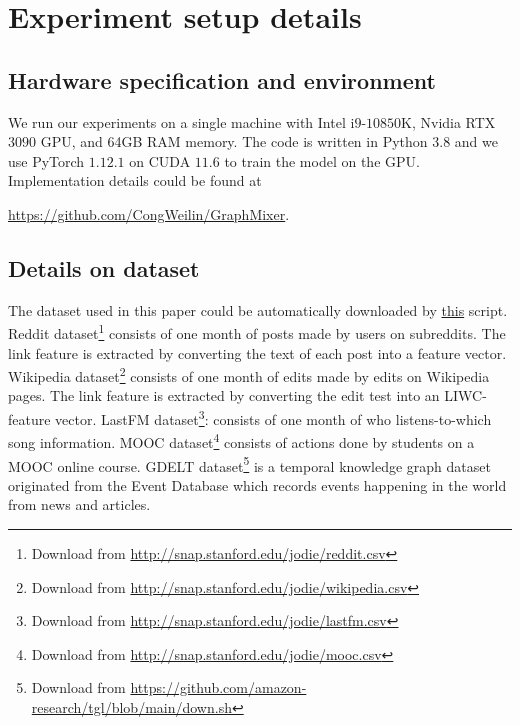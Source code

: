 \clearpage
\section{Experiment setup details} 

\subsection{Hardware specification and environment}
We run our experiments on a single machine with Intel i$9$-$10850$K, Nvidia RTX $3090$ GPU, and 64GB RAM memory. 
The code is written in Python $3.8$ and we use PyTorch $1.12.1$ on CUDA $11.6$ to train the model on the GPU. 
Implementation details could be found at 
\begin{center}
\url{https://github.com/CongWeilin/GraphMixer}.
\end{center}

\subsection{Details on dataset} \label{section:dataset}

The dataset used in this paper could be automatically downloaded by \href{https://github.com/CongWeilin/GraphMixer/blob/main/DATA/down.sh}{this} script.
Reddit dataset\footnote{Download from \url{http://snap.stanford.edu/jodie/reddit.csv}} consists of one month of posts made by users on subreddits. The link feature is extracted by converting the text of each post into a feature vector.
Wikipedia dataset\footnote{Download from \url{http://snap.stanford.edu/jodie/wikipedia.csv}} consists of one month of edits made by edits on Wikipedia pages. The link feature is extracted by converting the edit test into an LIWC-feature vector.
LastFM dataset\footnote{Download from \url{http://snap.stanford.edu/jodie/lastfm.csv}}: consists of one month of who listens-to-which song information.
MOOC dataset\footnote{Download from \url{http://snap.stanford.edu/jodie/mooc.csv}} consists of actions  done by students on a MOOC online course.
GDELT dataset\footnote{Download from \url{https://github.com/amazon-research/tgl/blob/main/down.sh}} is a temporal knowledge graph dataset originated from the Event Database which records events happening in the world from news and articles.



